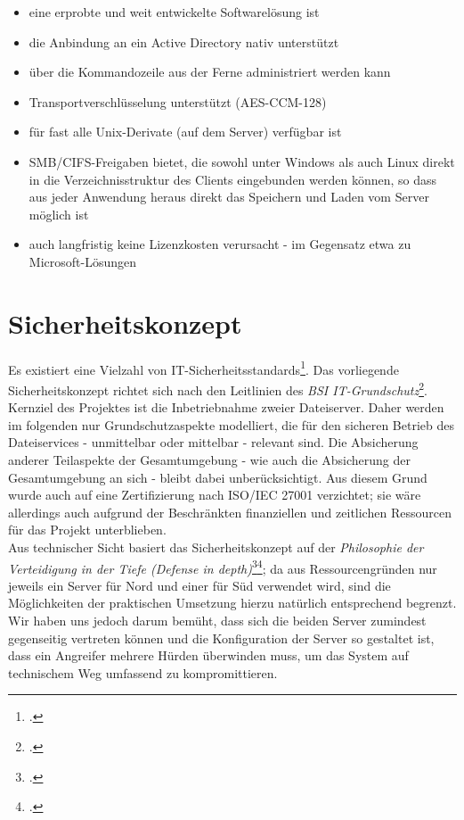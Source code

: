 \begin{itemize}
\item eine erprobte und weit entwickelte Softwarelösung ist
\item die Anbindung an ein Active Directory nativ unterstützt
\item über die Kommandozeile aus der Ferne administriert werden kann
\item Transportverschlüsselung unterstützt (AES-CCM-128)
\item für fast alle Unix-Derivate (auf dem Server) verfügbar ist
\item SMB/CIFS-Freigaben bietet, die sowohl unter Windows als auch Linux direkt in die Verzeichnisstruktur des Clients eingebunden werden können, so dass aus jeder Anwendung heraus direkt das Speichern und Laden vom Server möglich ist
\item auch langfristig keine Lizenzkosten verursacht - im Gegensatz etwa zu Microsoft-Lösungen
\end{itemize}

\newpage
\section{Sicherheitskonzept}
\label{sec:sicherheitskonzept}
Es existiert eine Vielzahl von IT-Sicherheitsstandards\footcite{wikiCyberSecStandards}. Das vorliegende Sicherheitskonzept richtet sich nach den Leitlinien des \emph{BSI IT-Grundschutz}\footcite{grundschutz}.\\

Kernziel des Projektes ist die Inbetriebnahme zweier Dateiserver. Daher werden im folgenden nur Grundschutzaspekte modelliert, die für den sicheren Betrieb des Dateiservices - unmittelbar oder mittelbar - relevant sind. Die Absicherung anderer Teilaspekte der Gesamtumgebung - wie auch die Absicherung der Gesamtumgebung an sich - bleibt dabei unberücksichtigt. Aus diesem Grund wurde auch auf  eine Zertifizierung nach ISO/IEC 27001 verzichtet; sie wäre allerdings auch aufgrund der Beschränkten finanziellen und zeitlichen Ressourcen für das Projekt unterblieben.\\

Aus technischer Sicht basiert das Sicherheitskonzept auf der \emph{Philosophie der Verteidigung in der Tiefe (Defense in depth)}\footcite{wikiDiD}\footcite{kuipers2006control}; da aus Ressourcengründen nur jeweils ein Server für Nord und einer für Süd verwendet wird, sind die Möglichkeiten der praktischen Umsetzung hierzu natürlich entsprechend begrenzt. Wir haben uns jedoch darum bemüht, dass sich die beiden Server zumindest gegenseitig vertreten können und die Konfiguration der Server so gestaltet ist, dass ein Angreifer mehrere Hürden überwinden muss, um das System auf technischem Weg umfassend zu kompromittieren.

